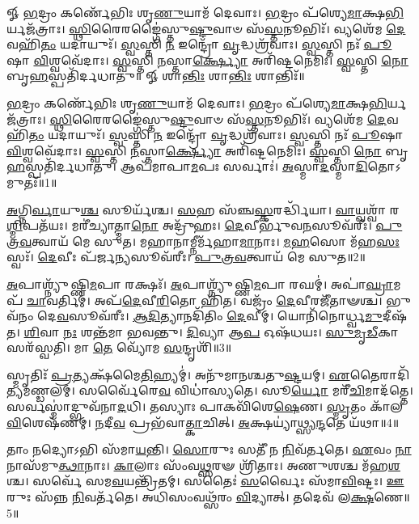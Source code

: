 \setcounter{anuvakam}{0}
𑍐 \ul{𑌭}\-𑌦𑍍𑌰𑌂 𑌕𑌰𑍍𑌣𑍇᳴𑌭𑌿𑌃 𑌶𑍃\-\ul{𑌣𑍁}\-𑌯𑌾𑌮᳴ 𑌦𑍇𑌵𑌾𑌃। \ul{𑌭}\-𑌦𑍍𑌰𑌂 𑌪᳴𑌶𑍍𑌯𑍇\-\ul{𑌮𑌾}\-𑌕𑍍𑌷\-\ul{𑌭𑌿}\-𑌰𑍍𑌯𑌜᳴𑌤𑍍𑌰𑌾𑌃। 
\-\ul{𑌸𑍍𑌥𑌿}\-𑌰𑍈𑌰𑌙𑍍𑌗𑍈॑𑌸𑍍𑌤𑍁\-\ul{𑌷𑍍𑌟𑍁}\-𑌵𑌾𑍞 𑌸᳴\-\ul{𑌸𑍍𑌤}\-𑌨𑍂𑌭𑌿𑌃᳴। 𑌵𑍍𑌯𑌶𑍇᳴𑌮 \ul{𑌦𑍇}\-𑌵𑌹𑌿᳴\-\ul{𑌤𑌂} 𑌯𑌦𑌾𑌯𑍁𑌃᳴। 
\-\ul{𑌸𑍍𑌵}\-𑌸𑍍𑌤𑌿 \ul{𑌨} 𑌇𑌨𑍍𑌦𑍍𑌰𑍋᳴ \ul{𑌵𑍃}\-𑌦𑍍𑌧𑌶𑍍𑌰᳴𑌵𑌾𑌃। \ul{𑌸𑍍𑌵}\-𑌸𑍍𑌤𑌿 𑌨𑌃᳴ \ul{𑌪𑍂}\-𑌷𑌾 \ul{𑌵𑌿}\-𑌶𑍍𑌵𑌵𑍇᳴𑌦𑌾𑌃। 
\-\ul{𑌸𑍍𑌵}\-𑌸𑍍𑌤𑌿 \ul{𑌨}\-𑌸𑍍𑌤𑌾\-\ul{𑌰𑍍𑌕𑍍𑌷𑍍𑌯𑍋} 𑌅𑌰𑌿᳴𑌷𑍍𑌟𑌨𑍇𑌮𑌿𑌃। \ul{𑌸𑍍𑌵}\-𑌸𑍍𑌤𑌿 \ul{𑌨𑍋} 𑌬𑍃\-\ul{𑌹}\-𑌸𑍍𑌪𑌤𑌿᳴𑌰𑍍𑌦𑌧𑌾𑌤𑍁॥
𑍐 𑌶𑌾\-\ul{𑌨𑍍𑌤𑌿𑌃} 𑌶𑌾\-\ul{𑌨𑍍𑌤𑌿𑌃} 𑌶𑌾𑌨𑍍𑌤𑌿𑌃᳴॥

\-\ul{𑌭}\-𑌦𑍍𑌰𑌂 𑌕𑌰𑍍𑌣𑍇᳴𑌭𑌿𑌃 𑌶𑍃\-\ul{𑌣𑍁}\-𑌯𑌾𑌮᳴ 𑌦𑍇𑌵𑌾𑌃। \ul{𑌭}\-𑌦𑍍𑌰𑌂 𑌪᳴𑌶𑍍𑌯𑍇\-\ul{𑌮𑌾}\-𑌕𑍍𑌷\-\ul{𑌭𑌿}\-𑌰𑍍𑌯𑌜᳴𑌤𑍍𑌰𑌾𑌃। 
\-\ul{𑌸𑍍𑌥𑌿}\-𑌰𑍈𑌰𑌙𑍍𑌗𑍈॑𑌸𑍍𑌤𑍁\-\ul{𑌷𑍍𑌟𑍁}\-𑌵𑌾𑍞 𑌸᳴\-\ul{𑌸𑍍𑌤}\-𑌨𑍂𑌭𑌿𑌃᳴। 𑌵𑍍𑌯𑌶𑍇᳴𑌮 \ul{𑌦𑍇}\-𑌵𑌹𑌿᳴\-\ul{𑌤𑌂} 𑌯𑌦𑌾𑌯𑍁𑌃᳴। 
\-\ul{𑌸𑍍𑌵}\-𑌸𑍍𑌤𑌿 \ul{𑌨} 𑌇𑌨𑍍𑌦𑍍𑌰𑍋᳴ \ul{𑌵𑍃}\-𑌦𑍍𑌧𑌶𑍍𑌰᳴𑌵𑌾𑌃। \ul{𑌸𑍍𑌵}\-𑌸𑍍𑌤𑌿 𑌨𑌃᳴ \ul{𑌪𑍂}\-𑌷𑌾 \ul{𑌵𑌿}\-𑌶𑍍𑌵𑌵𑍇᳴𑌦𑌾𑌃। 
\-\ul{𑌸𑍍𑌵}\-𑌸𑍍𑌤𑌿 \ul{𑌨}\-𑌸𑍍𑌤𑌾\-\ul{𑌰𑍍𑌕𑍍𑌷𑍍𑌯𑍋} 𑌅𑌰𑌿᳴𑌷𑍍𑌟𑌨𑍇𑌮𑌿𑌃। \ul{𑌸𑍍𑌵}\-𑌸𑍍𑌤𑌿 \ul{𑌨𑍋} 𑌬𑍃\-\ul{𑌹}\-𑌸𑍍𑌪𑌤𑌿᳴𑌰𑍍𑌦𑌧𑌾𑌤𑍁। 
𑌆𑌪᳴𑌮𑌾𑌪𑌾\-\ul{𑌮}\-𑌪𑌃 𑌸𑌰𑍍𑌵𑌾𑌃॑। \ul{𑌅}\-𑌸𑍍𑌮𑌾\-\ul{𑌦}\-𑌸𑍍𑌮𑌾\-\ul{𑌦𑌿}\-𑌤𑍋𑌽𑌮𑍁𑌤𑌃᳴॥1॥ 

\-\ul{𑌅}\-𑌗𑍍𑌨𑌿\-\ul{𑌰𑍍𑌵𑌾}\-𑌯𑍁\-\ul{𑌶𑍍𑌚} 𑌸𑍂𑌰𑍍𑌯᳴𑌶𑍍𑌚। \ul{𑌸}\-𑌹 𑌸᳴𑌞𑍍𑌚\-\ul{𑌸𑍍𑌕}\-𑌰𑌰𑍍𑌦𑍍𑌧𑌿᳴𑌯𑌾। 
\-\ul{𑌵𑌾}\-𑌯𑍍𑌵𑌶𑍍𑌵𑌾᳴ 𑌰\-\ul{𑌶𑍍𑌮𑌿}\-𑌪𑌤᳴𑌯𑌃। 𑌮𑌰𑍀॑𑌚𑍍𑌯𑌾𑌤𑍍𑌮𑌾\-\ul{𑌨𑍋} 𑌅𑌦𑍍𑌰𑍁᳴𑌹𑌃। 
\-\ul{𑌦𑍇}\-𑌵𑍀𑌰𑍍𑌭𑍁᳴𑌵\-\ul{𑌨}\-𑌸𑍂𑌵᳴𑌰𑍀𑌃। \ul{𑌪𑍁}\-\-\ul{𑌤𑍍𑌰}\-\-\ul{𑌵}\-𑌤𑍍𑌵𑌾𑌯᳴ 𑌮𑍇 𑌸𑍁𑌤। 
𑌮𑌹𑌾𑌨𑌾𑌮𑍍𑌨𑍀𑌰𑍍𑌮᳴𑌹𑌾\-\ul{𑌮𑌾}\-𑌨𑌾𑌃। \ul{𑌮}\-\-\ul{𑌹}\-𑌸𑍋 𑌮᳴𑌹\-\ul{𑌸𑌃} 𑌸𑍍𑌵𑌃᳴। 
\-\ul{𑌦𑍇}\-𑌵𑍀𑌃 𑌪᳴𑌰𑍍𑌜\-\ul{𑌨𑍍𑌯}\-𑌸𑍂𑌵᳴𑌰𑍀𑌃। \ul{𑌪𑍁}\-\-\ul{𑌤𑍍𑌰}\-\-\ul{𑌵}\-𑌤𑍍𑌵𑌾𑌯᳴ 𑌮𑍇 𑌸𑍁𑌤॥2॥

\-\ul{𑌅}\-𑌪𑌾𑌶𑍍𑌨𑍍𑌯𑍁᳴𑌷𑍍𑌣𑌿\-\ul{𑌮}\-𑌪𑌾 𑌰𑌕𑍍𑌷𑌃᳴। \ul{𑌅}\-𑌪𑌾𑌶𑍍𑌨𑍍𑌯𑍁᳴𑌷𑍍𑌣𑌿\-\ul{𑌮}\-𑌪𑌾 𑌰𑌘𑌮𑍍॑। 
𑌅𑌪𑌾॑\-\ul{𑌘𑍍𑌰𑌾}\-𑌮𑌪᳴ \ul{𑌚𑌾}\-𑌵𑌰𑍍𑌤𑌿𑌮𑍍॑। 𑌅𑌪᳴\-\ul{𑌦𑍇}\-𑌵𑍀\-\ul{𑌰𑌿}\-𑌤𑍋 𑌹𑌿᳴𑌤। 
𑌵𑌜𑍍𑌰𑌂᳴ \ul{𑌦𑍇}\-𑌵𑍀𑌰𑌜𑍀᳴𑌤𑌾𑍟𑌶𑍍𑌚। 𑌭𑍁𑌵᳴𑌨𑌂 𑌦𑍇\-\ul{𑌵}\-𑌸𑍂𑌵᳴𑌰𑍀𑌃। 
\-\ul{𑌆}\-\-\ul{𑌦𑌿}\-𑌤𑍍𑌯𑌾𑌨𑌦𑌿᳴𑌤𑌿𑌂 \ul{𑌦𑍇}\-𑌵𑍀𑌮𑍍। 𑌯𑍋𑌨𑌿᳴𑌨𑍋𑌰𑍍𑌧𑍍𑌵\-\ul{𑌮𑍁}\-𑌦𑍀𑌷᳴𑌤। 
\-\ul{𑌶𑌿}\-𑌵𑌾 \ul{𑌨𑌃} 𑌶𑌨𑍍𑌤᳴𑌮𑌾 𑌭𑌵𑌨𑍍𑌤𑍁। \ul{𑌦𑌿}\-𑌵𑍍𑌯𑌾 𑌆\-\ul{𑌪} 𑌓𑌷᳴𑌧𑌯𑌃। 
\-\ul{𑌸𑍁}\-\-\ul{𑌮𑍃}\-\-\ul{𑌡𑍀}\-𑌕𑌾 𑌸𑌰᳴𑌸𑍍𑌵𑌤𑌿। 𑌮𑌾 \ul{𑌤𑍇} 𑌵𑍍𑌯𑍋᳴𑌮 \ul{𑌸}\-𑌨𑍍𑌦𑍃𑌶𑌿᳴॥3॥\anuvakamend


𑌸𑍍𑌮𑍃𑌤𑌿𑌃᳴ \ul{𑌪𑍍𑌰}\-𑌤𑍍𑌯𑌕𑍍𑌷᳴𑌮𑍈\-\ul{𑌤𑌿}\-𑌹𑍍𑌯𑌮𑍍॑। 𑌅𑌨𑍁᳴𑌮𑌾𑌨𑌶𑍍𑌚𑌤𑍁\-\ul{𑌷𑍍𑌟}\-𑌯𑌮𑍍। 
\-\ul{𑌏}\-𑌤𑍈𑌰𑌾𑌦𑌿᳴𑌤𑍍𑌯\-𑌮𑌣𑍍𑌡𑌲𑌮𑍍। 𑌸𑌰𑍍𑌵𑍈᳴𑌰𑍇\-\ul{𑌵} 𑌵𑌿𑌧𑌾॑॑𑌸𑍍𑌯𑌤𑍇। 
𑌸𑍂\-\ul{𑌰𑍍𑌯𑍋} 𑌮𑌰𑍀᳴\-\ul{𑌚𑌿}\-𑌮𑌾𑌦᳴𑌤𑍍𑌤𑍇। 𑌸𑌰𑍍𑌵𑌸𑍍𑌮𑌾॑𑌦𑍍𑌭𑍁𑌵᳴𑌨𑌾\-\-\ul{𑌦}\-𑌧𑌿। 
𑌤𑌸𑍍𑌯𑌾𑌃 𑌪𑌾𑌕𑌵𑌿᳴𑌶𑍇\-\ul{𑌷𑍇}\-𑌣। \ul{𑌸𑍍𑌮𑍃}\-𑌤𑌂 𑌕𑌾᳴𑌲\-\-\ul{𑌵𑌿}\-𑌶𑍇𑌷᳴𑌣𑌮𑍍। 
\-\ul{𑌨}\-𑌦𑍀\-\ul{𑌵} 𑌪𑍍𑌰𑌭᳴𑌵𑌾\-\ul{𑌤𑍍𑌕𑌾}\-𑌚𑌿𑌤𑍍। \ul{𑌅}\-𑌕𑍍𑌷𑌯𑍍𑌯𑌾॑𑌥𑍍𑌸𑍍𑌯\-\ul{𑌨𑍍𑌦}\-𑌤𑍇 𑌯᳴𑌥𑌾॥4॥

𑌤𑌾𑌂 𑌨𑌦𑍍𑌯𑍋𑌽𑌭𑌿 𑌸᳴𑌮𑌾\-\ul{𑌯}\-𑌨𑍍𑌤𑌿। \ul{𑌸𑍋}\-𑌰𑍁𑌃 𑌸𑌤𑍀᳴ 𑌨 \ul{𑌨𑌿}\-𑌵᳴𑌰𑍍𑌤𑌤𑍇। 
\-\ul{𑌏}\-𑌵𑌂 \ul{𑌨𑌾}\-𑌨𑌾𑌸᳴𑌮𑍁\-\ul{𑌤𑍍𑌥𑌾}\-𑌨𑌾𑌃। \ul{𑌕𑌾}\-𑌲𑌾𑌃 𑌸𑌂᳴𑌵\-\ul{𑌥𑍍𑌸}\-𑌰𑍟 𑌶𑍍𑌰𑌿᳴𑌤𑌾𑌃। 
 𑌅𑌣𑍁𑌶𑌶𑍍𑌚 𑌮᳴𑌹\-\ul{𑌶}\-𑌶𑍍𑌚। 𑌸𑌰𑍍𑌵𑍇᳴ 𑌸𑌮\-\ul{𑌵}\-𑌯𑌨𑍍𑌤𑍍𑌰𑌿᳴𑌤𑌮𑍍। 
𑌸𑌤𑍈𑌃॑ \ul{𑌸}\-𑌰𑍍𑌵𑍈𑌃 𑌸᳴𑌮𑌾\-\ul{𑌵𑌿}\-𑌷𑍍𑌟𑌃। \ul{𑌊}\-𑌰𑍁𑌃 𑌸᳴𑌨𑍍𑌨 \ul{𑌨𑌿}\-𑌵𑌰𑍍𑌤᳴𑌤𑍇। 
𑌅𑌧𑌿𑌸𑌂𑌵𑌥𑍍𑌸᳴𑌰𑌂 \ul{𑌵𑌿}\-𑌦𑍍𑌯𑌾𑌤𑍍। 𑌤𑌦𑍇𑌵᳴ 𑌲\-\ul{𑌕𑍍𑌷}\-𑌣𑍇॥5॥

